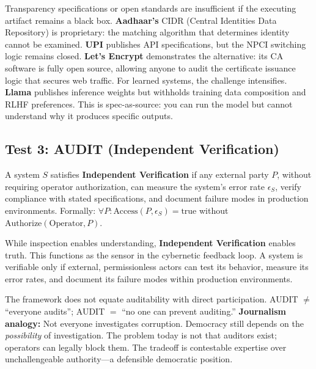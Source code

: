 Transparency specifications or open standards are insufficient if the executing artifact remains a black box. \textbf{Aadhaar's} CIDR (Central Identities Data Repository) is proprietary: the matching algorithm that determines identity cannot be examined. \textbf{UPI} publishes API specifications, but the NPCI switching logic remains closed. \textbf{Let's Encrypt} demonstrates the alternative: its CA software is fully open source, allowing anyone to audit the certificate issuance logic that secures web traffic. For learned systems, the challenge intensifies. \textbf{Llama} publishes inference weights but withholds training data composition and RLHF preferences. This is spec-as-source: you can run the model but cannot understand why it produces specific outputs.

\subsection{Test 3: AUDIT (Independent Verification)}

\begin{definition}[AUDIT]
\label{def:audit}
A system $S$ satisfies \textbf{Independent Verification} if any external party $P$, without requiring operator authorization, can measure the system's error rate $\epsilon_S$, verify compliance with stated specifications, and document failure modes in production environments. Formally: $\forall P: \text{Access}(P, \epsilon_S) = \text{true}$ without $\text{Authorize}(\text{Operator}, P)$.
\end{definition}

While inspection enables understanding, \textbf{Independent Verification} enables truth. This functions as the sensor in the cybernetic feedback loop. A system is verifiable only if external, permissionless actors can test its behavior, measure its error rates, and document its failure modes within production environments.

\begin{remark}
The framework does not equate auditability with direct participation. AUDIT $\neq$ ``everyone audits''; AUDIT $=$ ``no one can prevent auditing.'' \textbf{Journalism analogy:} Not everyone investigates corruption. Democracy still depends on the \textit{possibility} of investigation. The problem today is not that auditors exist; operators can legally block them. The tradeoff is contestable expertise over unchallengeable authority---a defensible democratic position.
\end{remark}

